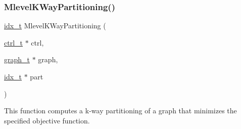 \subsubsection{\texorpdfstring{Mlevel\+K\+Way\+Partitioning()}{MlevelKWayPartitioning()}}
{\footnotesize\ttfamily \hyperlink{a00876_aaa5262be3e700770163401acb0150f52}{idx\+\_\+t} Mlevel\+K\+Way\+Partitioning (\begin{DoxyParamCaption}\item[{\hyperlink{a00742}{ctrl\+\_\+t} $\ast$}]{ctrl,  }\item[{\hyperlink{a00734}{graph\+\_\+t} $\ast$}]{graph,  }\item[{\hyperlink{a00876_aaa5262be3e700770163401acb0150f52}{idx\+\_\+t} $\ast$}]{part }\end{DoxyParamCaption})}

This function computes a k-\/way partitioning of a graph that minimizes the specified objective function.


